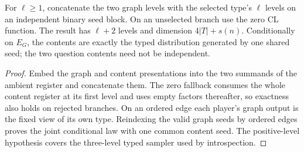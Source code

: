 \begin{lemma}
\label{lem:detype-cl}
\leanok
For $\ell\geq1$, concatenate the two graph levels with the selected type's $\ell$ levels on
an independent binary seed block. On an unselected branch use the zero CL
function. The result has $\ell+2$ levels and dimension $4|T|+s(n)$.
Conditionally on $E_G$, the contents are exactly the typed distribution
generated by one shared seed; the two question contents need not be independent.
\end{lemma}
\begin{proof}
\leanok
Embed the graph and content presentations into the two summands of the
ambient register and concatenate them. The zero fallback consumes the whole
content register at its first level and uses empty factors thereafter, so
exactness also holds on rejected branches. On an ordered edge each player's
graph output is the fixed view of its own type. Reindexing the valid graph
seeds by ordered edges proves the joint conditional law with one common
content seed. The positive-level hypothesis covers the three-level typed
sampler used by introspection.
\end{proof}


